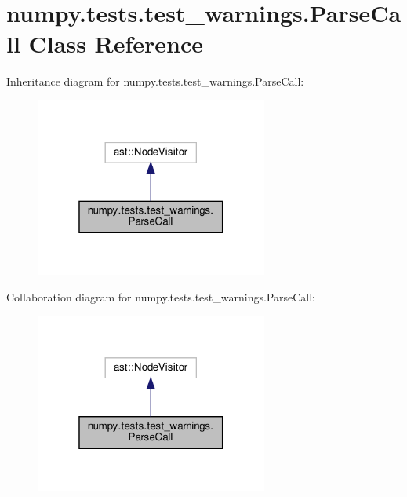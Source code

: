 \hypertarget{classnumpy_1_1tests_1_1test__warnings_1_1ParseCall}{}\section{numpy.\+tests.\+test\+\_\+warnings.\+Parse\+Call Class Reference}
\label{classnumpy_1_1tests_1_1test__warnings_1_1ParseCall}


Inheritance diagram for numpy.\+tests.\+test\+\_\+warnings.\+Parse\+Call\+:
\nopagebreak
\begin{figure}[H]
\begin{center}
\leavevmode
\includegraphics[width=217pt]{classnumpy_1_1tests_1_1test__warnings_1_1ParseCall__inherit__graph}
\end{center}
\end{figure}


Collaboration diagram for numpy.\+tests.\+test\+\_\+warnings.\+Parse\+Call\+:
\nopagebreak
\begin{figure}[H]
\begin{center}
\leavevmode
\includegraphics[width=217pt]{classnumpy_1_1tests_1_1test__warnings_1_1ParseCall__coll__graph}
\end{center}
\end{figure}
